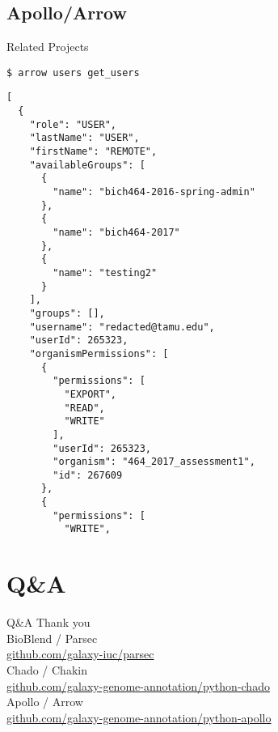 \documentclass[12pt]{phage3slides} %
\begin{document}
\subsection{Apollo/Arrow}
\begin{frame}[fragile,t]{Related Projects}
\begin{verbatim}
$ arrow users get_users
\end{verbatim}
\begin{verbatim}
[
  {
    "role": "USER",
    "lastName": "USER",
    "firstName": "REMOTE",
    "availableGroups": [
      {
        "name": "bich464-2016-spring-admin"
      },
      {
        "name": "bich464-2017"
      },
      {
        "name": "testing2"
      }
    ],
    "groups": [],
    "username": "redacted@tamu.edu",
    "userId": 265323,
    "organismPermissions": [
      {
        "permissions": [
          "EXPORT",
          "READ",
          "WRITE"
        ],
        "userId": 265323,
        "organism": "464_2017_assessment1",
        "id": 267609
      },
      {
        "permissions": [
          "WRITE",
\end{verbatim}
\end{frame}


\section{Q\&A}
\begin{frame}{Q\&A}
	Thank you\\[1em]

BioBlend / Parsec \\
\url{github.com/galaxy-iuc/parsec} \\[.5em]
Chado / Chakin \\
\url{github.com/galaxy-genome-annotation/python-chado} \\[.5em]
Apollo / Arrow \\
\url{github.com/galaxy-genome-annotation/python-apollo}\\[.5em]

	\begin{center}
		\informationErascheTable%
		\logosTamuCPT%
		\fundingNSFABIannotation%
	\end{center}
\end{frame}
\end{document}

